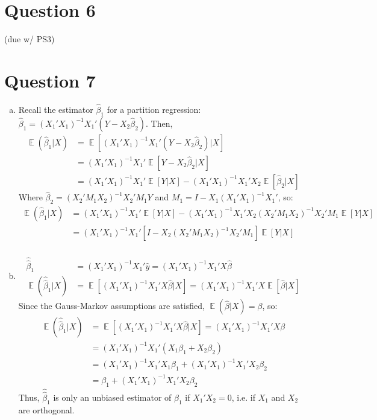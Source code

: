 \documentclass{article}
\newcommand{\bhat}{\hat{\beta}}
\DeclareMathOperator{\E}{\mathbb{E}}%
\begin{document}

\section*{Question 6}
(due w/ PS3)



\section*{Question 7}
\begin{enumerate}[(a)]
	\item 
		Recall the estimator $\bhat_1$ for a partition regression: ${\bhat_1 = (X_1'X_1)^{-1}X_1'(Y-X_2\bhat_2)}$. Then,
			\begin{align*}
				\E(\bhat_1|X) 	&= \E\left[(X_1'X_1)^{-1}X_1'(Y-X_2\bhat_2)|X\right]	\\
								&= (X_1'X_1)^{-1}X_1'\E\left[Y-X_2\bhat_2|X\right]		\\
								&= (X_1'X_1)^{-1}X_1'\E\left[Y|X\right] - (X_1'X_1)^{-1}X_1'X_2\E\left[\bhat_2|X\right]
			\end{align*}
			Where ${\bhat_2=(X_2'M_1X_2)^{-1}X_2'M_1Y}$ and ${M_1=I-X_1(X_1'X_1)^{-1}X_1'}$, so:
			\begin{align*}
				\E(\bhat_1|X) 	&= (X_1'X_1)^{-1}X_1'\E\left[Y|X\right] - (X_1'X_1)^{-1}X_1'X_2(X_2'M_1X_2)^{-1}X_2'M_1\E\left[Y|X\right]	\\
								&= (X_1'X_1)^{-1}X_1'\left[I - X_2(X_2'M_1X_2)^{-1}X_2'M_1\right]\E\left[Y|X\right]	\\
			\end{align*}
	
	\pagebreak
	\item 
		\begin{align*}
			\hat{\bhat}_1 			&= (X_1'X_1)^{-1}X_1'\hat{y} = (X_1'X_1)^{-1}X_1'X\bhat	\\
			\E(\hat{\bhat}_1|X)		&= \E\left[(X_1'X_1)^{-1}X_1'X\bhat|X\right] = (X_1'X_1)^{-1}X_1'X\E\left[\bhat|X\right] 
		\end{align*}
		Since the Gauss-Markov assumptions are satisfied, ${\E(\bhat|X)=\beta}$, so:
		\begin{align*}
			\E(\hat{\bhat}_1|X)		&= \E\left[(X_1'X_1)^{-1}X_1'X\bhat|X\right] = (X_1'X_1)^{-1}X_1'X\beta	\\
									&= (X_1'X_1)^{-1}X_1'(X_1\beta_1 + X_2\beta_2) 							\\
									&= (X_1'X_1)^{-1}X_1'X_1\beta_1 + (X_1'X_1)^{-1}X_1'X_2\beta_2 			\\
									&= \beta_1 + (X_1'X_1)^{-1}X_1'X_2\beta_2
		\end{align*}
		Thus, $\hat{\bhat}_1$ is only an unbiased estimator of $\beta_1$ if ${X_1'X_2=0}$, i.e. if $X_1$ and $X_2$ are orthogonal.
		

\end{enumerate}
\end{document}
